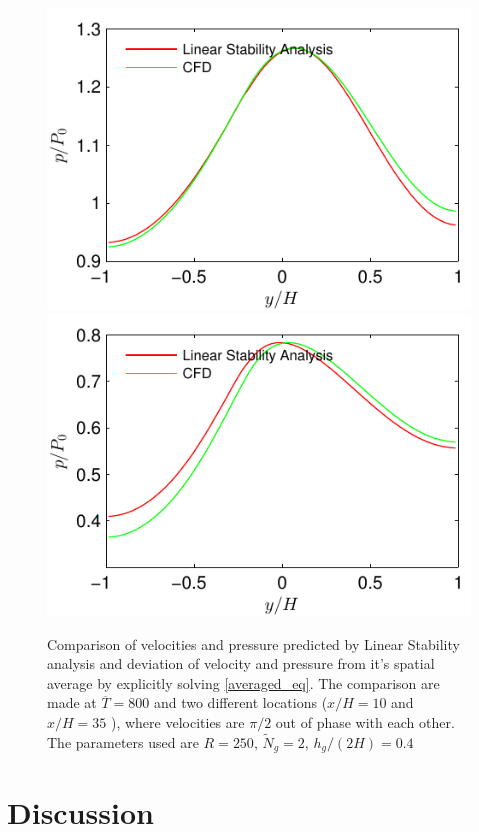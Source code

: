 \documentclass[12pt]{report}   %
\newcommand{\Ndg}{\tilde{N}_g}
\renewcommand{\bar}{\overline}
\begin{document}
\begin{figure}
\centerline{\includegraphics{LinearStabilityVsCFD_Saturated_p_phase0} \includegraphics{LinearStabilityVsCFD_Saturated_p_phase90}}
\caption{Comparison of velocities and pressure predicted by Linear Stability analysis and deviation of velocity and pressure from it's spatial average by explicitly solving \eqref{averaged_eq}. The comparison are made at $\bar{T}=800$ and two different locations ($x/H=10$ and $x/H=35$ ), where velocities are $\pi/2$ out of phase with each other. The parameters used are $R=250$, $\Ndg=2$, $h_g/(2H)=0.4$ }
\label{CFDVsLinearStabilitySaturated}
\end{figure}





\chapter{Discussion}
\end{document}
